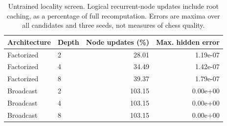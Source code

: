 \begin{table}[t]
\centering\small
\caption{Untrained locality screen. Logical recurrent-node updates include root caching, as a percentage of full recomputation. Errors are maxima over all candidates and three seeds, not measures of chess quality.}
\begin{tabular}{llrr}
\toprule
Architecture & Depth & Node updates (\%) & Max. hidden error \\
\midrule
Factorized & 2 & 28.01 & 1.19e-07 \\
Factorized & 4 & 34.49 & 1.42e-07 \\
Factorized & 8 & 39.37 & 1.79e-07 \\
Broadcast & 2 & 103.15 & 0.00e+00 \\
Broadcast & 4 & 103.15 & 0.00e+00 \\
Broadcast & 8 & 103.15 & 0.00e+00 \\
\bottomrule
\end{tabular}
\end{table}

